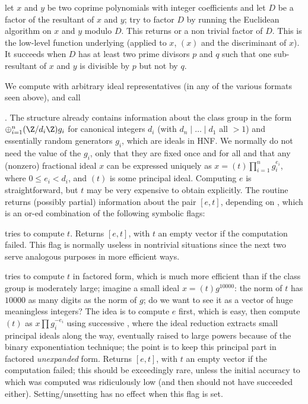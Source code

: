  let $x$ and $y$ be two
coprime polynomials with integer coefficients and let $D$ be
a factor of the resultant of $x$ and $y$; try to factor $D$ by running the
Euclidean algorithm on $x$ and $y$ modulo $D$. This returns 
or a non trivial factor of $D$. This is the low-level function underlying
 (applied to $x$, $(x)$ and the
discriminant of $x$). It succeeds when $D$ has at least two prime divisors
$p$ and $q$ such that one sub-resultant of $x$ and $y$ is divisible by $p$
but not by $q$.


We compute with arbitrary ideal representatives (in any of the various
formats seen above), and call

. The 
structure already contains information about the class group in the form
$\oplus_{i=1}^n (\Z/d_i\Z) g_i$ for canonical integers $d_i$
(with $d_n\mid\dots\mid d_1$ all $> 1$) and essentially random generators
$g_i$, which are ideals in HNF. We normally do not need the value of the
$g_i$, only that they are fixed once and for all and that any (nonzero)
fractional ideal $x$ can be expressed uniquely as $x = (t)\prod_{i=1}^n
g_i^{e_i}$, where $0 \leq e_i < d_i$, and $(t)$ is some principal ideal.
Computing $e$ is straightforward, but $t$ may be very expensive to obtain
explicitly. The routine returns (possibly partial) information about the pair
$[e,t]$, depending on , which is an or-ed combination of the
following symbolic flags:

\item {} tries to compute $t$.
Returns $[e,t]$, with $t$ an empty vector if the computation failed. This
flag is normally useless in nontrivial situations since the next two serve
analogous purposes in more efficient ways.

\item {} tries to compute $t$ in factored form, which is
much more efficient than  if the class group is moderately
large; imagine a small ideal $x = (t)g^{10000}$: the norm of $t$ has $10000$
as many digits as the norm of $g$; do we want to see it as a vector
of huge meaningless integers? The idea is to compute $e$ first, which is
easy, then compute $(t)$ as $x \prod g_i^{-e_i}$ using successive
, where the ideal reduction extracts small principal ideals
along the way, eventually raised to large powers because of the binary
exponentiation technique; the point is to keep this principal part in
factored \emph{unexpanded} form. Returns $[e,t]$, with $t$ an empty vector if
the computation failed; this should be exceedingly rare, unless the initial
accuracy to which  was computed was ridiculously low (and then
 should not have succeeded either). Setting/unsetting
 has no effect when this flag is set.

